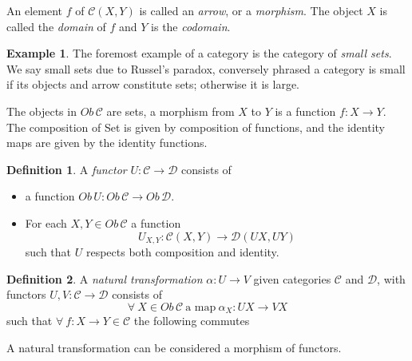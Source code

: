 \documentclass{article}
\theoremstyle{definition}
\newtheorem{definition}{Definition}[section]
\newtheorem{example}{Example}[section]
\begin{document}
\par
An element $f$ of $\mathcal{C}(X,Y)$ is called an \textit{arrow},
or a \textit{morphism}. The object $X$ is called the \textit{domain} of $f$ and $Y$ is
the \textit{codomain}.

\begin{example}
    The foremost example of a category is the category of \textit{small sets}.
    We say small sets due to Russel's paradox, conversely phrased a category is small
    if its objects and arrow constitute sets; otherwise it is large.

    The objects in $Ob\,\mathcal{C}$ are sets,
    a morphism from $X$ to $Y$ is a function $f : X \rightarrow Y$.
    The composition of Set is given by composition of functions,
    and the identity maps are given by the identity functions.
\end{example}

\begin{definition}
    A \textit{functor} $U : \mathcal{C} \rightarrow \mathcal{D}$ consists of
    \begin{itemize}
        \item a function $Ob\,U : Ob\,\mathcal{C} \rightarrow Ob\,\mathcal{D}$.
        \item For each $X, Y \in Ob\,\mathcal{C}$ a function
            $$U_{X,Y} : \mathcal{C}(X,Y) \rightarrow \mathcal{D}(UX, UY)$$
            such that $U$ respects both composition and identity.
    \end{itemize}
\end{definition}

\begin{definition}
    A \textit{natural transformation} $\alpha : U \rightarrow V$
    given categories $\mathcal{C}$ and $\mathcal{D}$,
    with functors $U, V : \mathcal{C} \rightarrow \mathcal{D}$
    consists of
    $$
    \forall\ X \in Ob\,\mathcal{C}\ \textrm{a map}
    \ \alpha_X : UX \rightarrow VX
    $$
    such that $\forall\ f : X \rightarrow Y \in \mathcal{C}$ the following commutes
    \begin{center}
    \end{center}
    A natural transformation can be considered a morphism of functors.
\end{definition}
\end{document}
